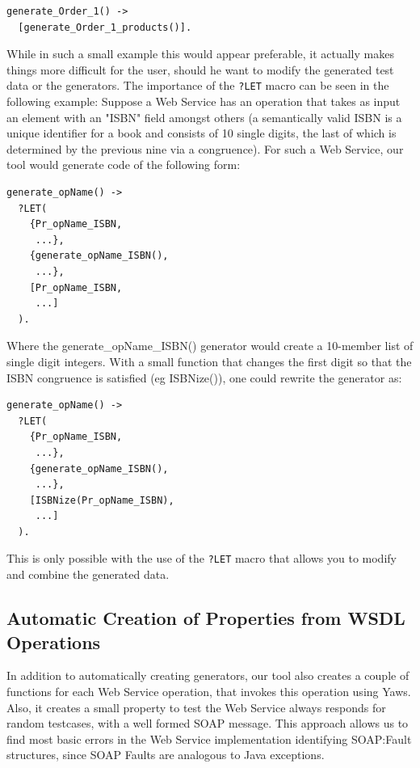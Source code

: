 \documentclass[submission,copyright,a4]{eptcs}
\newcommand{\LET}{\texttt{?LET}\xspace}
\begin{document}
\begin{lstlisting}
generate_Order_1() ->
  [generate_Order_1_products()].
\end{lstlisting}

While in such a small example this would appear preferable, it actually makes things more difficult for the user, should he want to modify the generated test data or the generators. The importance of the \LET macro can be seen in the following example: Suppose a Web Service has an operation that takes as input an element with an "ISBN" field amongst others (a semantically valid ISBN is a unique identifier for a book and consists of 10 single digits, the last of which is determined by the previous nine via a congruence). For such a Web Service, our tool would generate code of the following form:

\begin{lstlisting}
generate_opName() ->
  ?LET(
    {Pr_opName_ISBN,
     ...},
    {generate_opName_ISBN(),
     ...},
    [Pr_opName_ISBN,
     ...]
  ).
\end{lstlisting}

Where the generate\_opName\_ISBN() generator would create a 10-member list of single digit integers. With a small function that changes the first digit so that the ISBN congruence is satisfied (eg ISBNize()), one could rewrite the generator as:

\begin{lstlisting}
generate_opName() ->
  ?LET(
    {Pr_opName_ISBN,
     ...},
    {generate_opName_ISBN(),
     ...},
    [ISBNize(Pr_opName_ISBN),
     ...]
  ).
\end{lstlisting}

This is only possible with the use of the \LET macro that allows you to modify and combine the generated data. 


\subsection{Automatic Creation of Properties from WSDL Operations}

In addition to automatically creating generators, our tool also creates a couple of functions for each Web Service operation, that invokes this operation using Yaws. Also, it creates a small property to test the Web Service always responds for random testcases, with a well formed SOAP message. This approach allows us to find most basic errors in the Web Service implementation identifying SOAP:Fault structures, since SOAP Faults are analogous to Java exceptions. 
\end{document}
